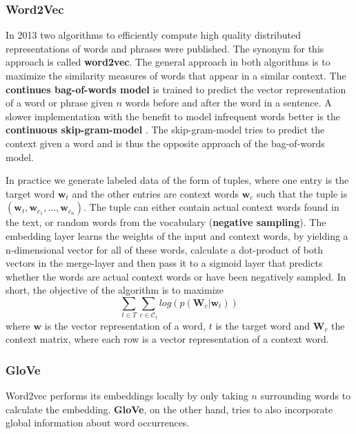 \subsubsection{Word2Vec}

In 2013 two algorithms to efficiently compute high quality distributed representations of words and phrases were published. The synonym for this approach is called \textbf{word2vec}. The general approach in both algorithms is to maximize the similarity measures of words that appear in a similar context. The \textbf{continues bag-of-words model} is trained to predict the vector representation of a word or phrase given $n$ words before and after the word in a sentence. A slower implementation with the benefit to model infrequent words better is the \textbf{continuous skip-gram-model} \citep{word2vec}. The skip-gram-model tries to predict the context given a word and is thus the opposite approach of the bag-of-words model.

In practice we generate labeled data of the form of tuples, where one entry is the target word $\mathbf{w}_t$ and the other entries are context words $\mathbf{w}_c$ such that the tuple is $(\mathbf{w}_t, \mathbf{w}_{c_{1}}, \dots, \mathbf{w}_{c_{n}})$. The tuple can either contain actual context words found in the text, or random words from the vocabulary (\textbf{negative sampling}). The embedding layer learns the weights of the input and context words, by yielding a n-dimensional vector for all of these words, calculate a dot-product of both vectors in the merge-layer and then pass it to a sigmoid layer that predicts whether the words are actual context words or have been negatively sampled. In short, the objective of the algorithm is to maximize
	\[\sum_{t \in T} \sum_{c \in \mathcal{C}_t} log( p(\mathbf{W}_c|\mathbf{w}_t))\]
	where $\mathbf{w}$ is the vector representation of a word, $t$ is the target word and $\mathbf{W}_c$ the context matrix, where each row is a vector representation of a context word.

\subsubsection{GloVe}

Word2vec performs its embeddings locally by only taking $n$ surrounding words to calculate the embedding. \textbf{GloVe}, on the other hand, tries to also incorporate global information about word occurrences.

